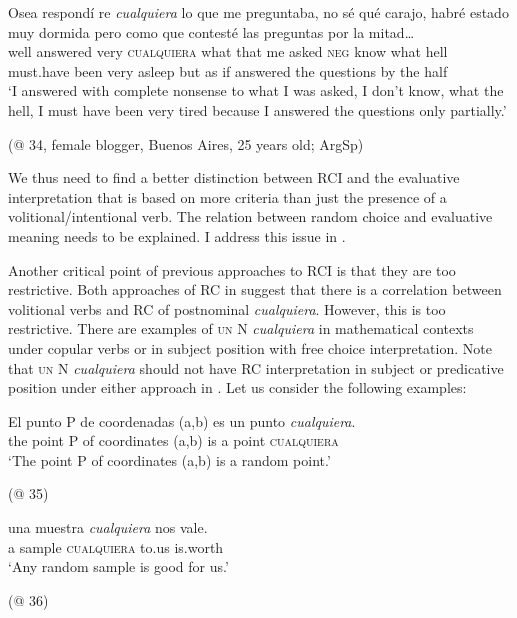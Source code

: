 \ea 
\label{ex:key:106} %
  \gll Osea respondí re \textit{cualquiera} lo que me preguntaba, no sé qué carajo, habré estado muy dormida pero como que contesté las preguntas por la mitad…\\
   well answered very \textsc{cualquiera} what that {me} asked \textsc{neg} know what hell must.have been very asleep but as if answered the questions by the half\\
  \glt ‘I answered with complete nonsense to what I was asked, I don’t know, what the hell, I must have been very tired because I answered the questions only partially.’

  (@ 34, female blogger, Buenos Aires, 25 years old; ArgSp)
\z

We thus need to find a better distinction between RCI and the evaluative interpretation that is based on more criteria than just the presence of a volitional/intentional verb. The relation between random choice and evaluative meaning needs to be explained. I address this issue in .

Another critical point of previous approaches to RCI is that they are too restrictive. Both approaches of RC in  suggest that there is a correlation between volitional verbs and RC of postnominal \textit{cualquiera}. However, this is too restrictive. There are examples of \textsc{un} N \textit{cualquiera} in mathematical contexts under copular verbs or in subject position with free choice interpretation. Note that \textsc{un} N \textit{cualquiera} should not have RC interpretation in subject or predicative position under either approach in . Let us consider the following examples:

\ea %
\label{bkm:Ref43031271}  \gll El punto P de coordenadas (a,b) es un punto \textit{cualquiera}.\\
the point P of coordinates (a,b) is a point \textsc{cualquiera}\\
\glt ‘The point P of coordinates (a,b) is a random point.’

(@ 35)
\z

\ea %
\label{bkm:Ref43031168}  
\gll una muestra \textit{cualquiera} nos vale.\\
a sample \textsc{cualquiera} to.us is.worth\\ 
\glt ‘Any random sample is good for us.’

  (@ 36)
\z

